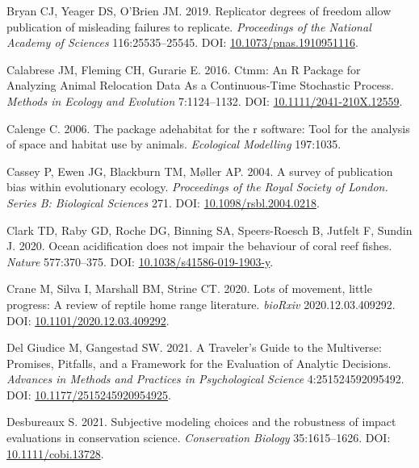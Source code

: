 \documentclass[10pt,a4paper]{article}
\newlength{\cslhangindent}
\newlength{\cslentryspacingunit} %
\newenvironment{CSLReferences}[2] %
 {%
  \setlength{\parindent}{0pt}
  \ifodd #1
  \let\oldpar\par
  \def\par{\hangindent=\cslhangindent\oldpar}
  \fi
  \setlength{\parskip}{#2\cslentryspacingunit}
 }%
 {}
\begin{document}
\begin{CSLReferences}{1}{0}
\leavevmode{}%
Bryan CJ, Yeager DS, O'Brien JM. 2019. Replicator degrees of freedom allow publication of misleading failures to replicate. \emph{Proceedings of the National Academy of Sciences} 116:25535--25545. DOI: \href{https://doi.org/10.1073/pnas.1910951116}{10.1073/pnas.1910951116}.

\leavevmode{}%
Calabrese JM, Fleming CH, Gurarie E. 2016. Ctmm: An {R} {Package} for {Analyzing} {Animal} {Relocation} {Data} {As} a {Continuous}-{Time} {Stochastic} {Process}. \emph{Methods in Ecology and Evolution} 7:1124--1132. DOI: \href{https://doi.org/10.1111/2041-210X.12559}{10.1111/2041-210X.12559}.

\leavevmode{}%
Calenge C. 2006. The package adehabitat for the r software: Tool for the analysis of space and habitat use by animals. \emph{Ecological Modelling} 197:1035.

\leavevmode{}%
Cassey P, Ewen JG, Blackburn TM, Møller AP. 2004. A survey of publication bias within evolutionary ecology. \emph{Proceedings of the Royal Society of London. Series B: Biological Sciences} 271. DOI: \href{https://doi.org/10.1098/rsbl.2004.0218}{10.1098/rsbl.2004.0218}.

\leavevmode{}%
Clark TD, Raby GD, Roche DG, Binning SA, Speers-Roesch B, Jutfelt F, Sundin J. 2020. Ocean acidification does not impair the behaviour of coral reef fishes. \emph{Nature} 577:370--375. DOI: \href{https://doi.org/10.1038/s41586-019-1903-y}{10.1038/s41586-019-1903-y}.

\leavevmode{}%
Crane M, Silva I, Marshall BM, Strine CT. 2020. Lots of movement, little progress: {A} review of reptile home range literature. \emph{bioRxiv} 2020.12.03.409292. DOI: \href{https://doi.org/10.1101/2020.12.03.409292}{10.1101/2020.12.03.409292}.

\leavevmode{}%
Del Giudice M, Gangestad SW. 2021. A {Traveler}'s {Guide} to the {Multiverse}: {Promises}, {Pitfalls}, and a {Framework} for the {Evaluation} of {Analytic} {Decisions}. \emph{Advances in Methods and Practices in Psychological Science} 4:251524592095492. DOI: \href{https://doi.org/10.1177/2515245920954925}{10.1177/2515245920954925}.

\leavevmode{}%
Desbureaux S. 2021. Subjective modeling choices and the robustness of impact evaluations in conservation science. \emph{Conservation Biology} 35:1615--1626. DOI: \href{https://doi.org/10.1111/cobi.13728}{10.1111/cobi.13728}.


\end{CSLReferences}
\end{document}
